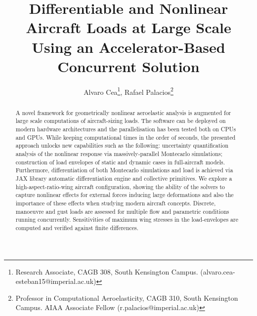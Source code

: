 \documentclass[11pt]{article}
\author{Alvaro Cea\footnote{Research Associate, CAGB 308, South Kensington Campus. (alvaro.cea-esteban15@imperial.ac.uk)}, Rafael Palacios\footnote{Professor in Computational Aeroelasticity, CAGB 310, South Kensington Campus. AIAA Associate Fellow (r.palacios@imperial.ac.uk)}}
\date{}
\title{Differentiable and Nonlinear Aircraft Loads at Large Scale Using an Accelerator-Based Concurrent Solution}
\begin{document}
\maketitle

\begin{abstract}
A novel framework for geometrically nonlinear aeroelastic analysis is augmented for large scale computations of aircraft-sizing loads. The software can be deployed on modern hardware architectures and the parallelisation has been tested both on CPUs and GPUs. While keeping computational times in the order of seconds, the presented approach unlocks new capabilities such as the following: uncertainty quantification analysis of the nonlinear response via massively-parallel Montecarlo simulations; construction of load envelopes of static and dynamic cases in full-aircraft models. Furthermore, differentiation of both Montecarlo simulations and load is achieved via JAX library automatic differentiation engine and collective primitives. 
We explore a high-aspect-ratio-wing aircraft configuration, showing the ability of the solvers to capture nonlinear effects for external forces inducing large deformations and also the importance of these effects when studying modern aircraft concepts. Discrete, manoeuvre and gust loads are assessed for multiple flow and parametric conditions running concurrently. Sensitivities of maximum wing stresses in the load-envelopes are computed and verified against finite differences.  
\end{abstract}
\end{document}
